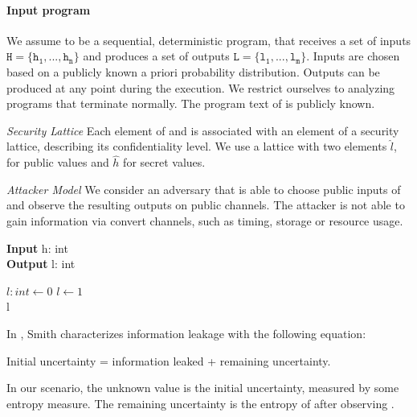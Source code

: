 \paragraph{Input program} We assume \p to be a sequential, deterministic program, that receives a set of inputs $\mathtt{H = \{h_1, ..., h_n\}}$ and produces a set of outputs $\mathtt{L = \{l_1, ..., l_m\}}$. Inputs are chosen based on a publicly known a priori probability distribution. Outputs can be produced at any point during the execution. 
We restrict ourselves to analyzing programs that terminate normally. The program text of \p is publicly known.

\emph{Security Lattice} Each element of \In and \Out is associated with an element of a security lattice, describing its confidentiality level. We use a lattice with two elements $\hat{l}$, for public values and $\hat{h}$ for secret values.


\emph{Attacker Model} We consider an adversary \A that is able to choose public inputs of \p and observe the resulting outputs on public channels. The attacker is not able to gain information via convert channels, such as timing, storage or resource usage.



\begin{algorithm}
	\caption{} %
    \hspace*{\algorithmicindent} \textbf{Input} h: int \\
    \hspace*{\algorithmicindent} \textbf{Output} l: int
	\begin{algorithmic}[1]
        \State $l: int \leftarrow 0$
        \State $l \leftarrow 1$
        \EndIf\\
        \Return l
	\end{algorithmic} 
\end{algorithm}

In \cite{smith09}, Smith characterizes information leakage with the following equation:
\begin{center}
    Initial uncertainty = information leaked + remaining uncertainty.
\end{center}
In our scenario, the unknown value \In is the initial uncertainty, measured by some entropy measure. The remaining uncertainty is the entropy of \In after observing \Out. 

